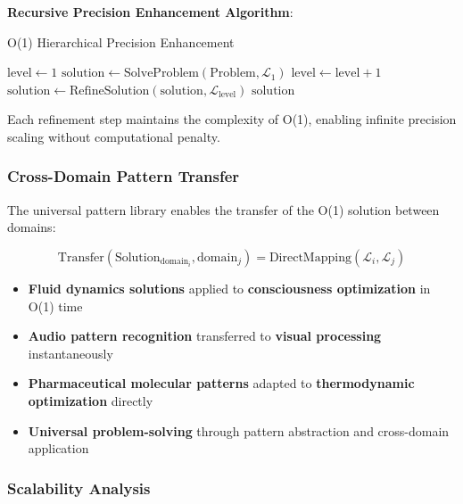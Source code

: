 \documentclass[11pt,a4paper]{article}
\theoremstyle{remark}
\begin{document}
\textbf{Recursive Precision Enhancement Algorithm}:

\begin{algorithm}
\caption{O(1) Hierarchical Precision Enhancement}
\begin{algorithmic}[1]
    \State $\text{level} \leftarrow 1$
    \State $\text{solution} \leftarrow \text{SolveProblem}(\text{Problem}, \mathcal{L}_1)$ 
        \State $\text{level} \leftarrow \text{level} + 1$
        \State $\text{solution} \leftarrow \text{RefineSolution}(\text{solution}, \mathcal{L}_{\text{level}})$ 
    \EndWhile
    \Return $\text{solution}$
\EndProcedure
\end{algorithmic}
\end{algorithm}

Each refinement step maintains the complexity of O(1), enabling infinite precision scaling without computational penalty.

\subsubsection{Cross-Domain Pattern Transfer}

The universal pattern library enables the transfer of the O(1) solution between domains:

\begin{equation}
\text{Transfer}(\text{Solution}_{\text{domain}_i}, \text{domain}_j) = \text{DirectMapping}(\mathcal{L}_i, \mathcal{L}_j)
\end{equation}

\begin{itemize}
\item \textbf{Fluid dynamics solutions} applied to \textbf{consciousness optimization} in O(1) time
\item \textbf{Audio pattern recognition} transferred to \textbf{visual processing} instantaneously  
\item \textbf{Pharmaceutical molecular patterns} adapted to \textbf{thermodynamic optimization} directly
\item \textbf{Universal problem-solving} through pattern abstraction and cross-domain application
\end{itemize}


\subsubsection{Scalability Analysis}
\end{document}
